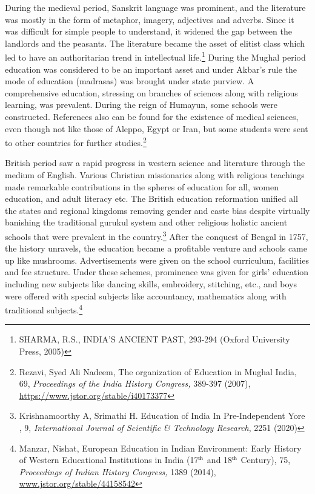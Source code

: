 \begin{multicols}{2}
\noi
During the medieval period, Sanskrit language was prominent, and the literature was mostly
in the form of metaphor, imagery, adjectives and adverbs. Since it was difficult for simple
people to understand, it widened the gap between the landlords and the peasants. The
literature became the asset of elitist class which led to have an authoritarian trend in intellectual life.\footnote{SHARMA, R.S., INDIA’S ANCIENT PAST, 293-294 (Oxford University Press, 2005)} During the Mughal period education was considered to be an important
asset and under Akbar’s rule the mode of education (madrasas) was brought under state
purview. A comprehensive education, stressing on branches of sciences along with religious
learning, was prevalent. During the reign of Humayun, some schools were constructed.
References also can be found for the existence of medical sciences, even though not like
those of Aleppo, Egypt or Iran, but some students were sent to other countries for further
studies.\footnote{Rezavi, Syed Ali Nadeem, The organization of Education in Mughal India, 69, \textit{Proceedings of the India History Congress,} 389-397 (2007), \url{https://www.jstor.org/stable/i40173377}}

\noi
British period saw a rapid progress in western science and literature through the medium of
English. Various Christian missionaries along with religious teachings made remarkable
contributions in the spheres of education for all, women education, and adult literacy etc. The
British education reformation unified all the states and regional kingdoms removing gender
and caste bias despite virtually banishing the traditional gurukul system and other religious
holistic ancient schools that were prevalent in the country.\footnote{Krishnamoorthy A, Srimathi H. Education of India In Pre-Independent Yore , 9, \textit{International Journal of Scientific \& Technology Research}, 2251 (2020)} After the conquest of Bengal in 1757, the history unravels, the education became a profitable venture and schools came up
like mushrooms. Advertisements were given on the school curriculum, facilities and fee
structure. Under these schemes, prominence was given for girls’ education including new
subjects like dancing skills, embroidery, stitching, etc., and boys were offered with special
subjects like accountancy, mathematics along with traditional subjects.\footnote{Manzar, Nishat, European Education in Indian Environment: Early History of Western Educational Institutions in India (17$^{\rm th}$ and 18$^{\rm th}$ Century), 75, \textit{Proceedings of Indian History Congress,} 1389 (2014), \url{www.jstor.org/stable/44158542}}


\end{multicols}
